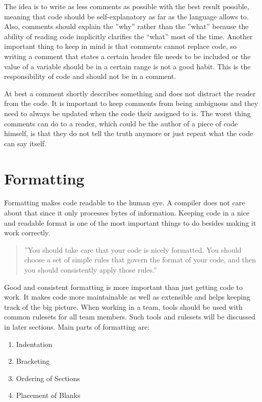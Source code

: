 The idea is to write as less comments as possible with the best result possible, meaning that code should be self-explanatory as far as the language allows to. Also, comments should explain the ''why'' rather than the ''what'' because the ability of reading code implicitly clarifies the “what” most of the time. Another important thing to keep in mind is that comments cannot replace code, so writing a comment that states a certain header file needs to be included or the value of a variable should be in a certain range is not a good habit. This is the responsibility of code and should not be in a comment.

At best a comment shortly describes something and does not distract the reader from the code. It is important to keep comments from being ambiguous and they need to always be updated when the code their assigned to is. The worst thing comments can do to a reader, which could be the author of a piece of code himself, is that they do not tell the truth anymore or just repeat what the code can say itself.

\section{Formatting}
Formatting makes code readable to the human eye. A compiler does not care about that since it only processes bytes of information. Keeping code in a nice and readable format is one of the most important things to do besides making it work correctly.
\begin{quote}
''You should take care that your code is nicely formatted. You should choose a set of simple rules that govern the format of your code, and then you should consistently apply those rules.'' \citep{Martin-Code-2008}
\end{quote}
Good and consistent formatting is more important than just getting code to work. It makes code more maintainable as well as extensible and helps keeping track of the big picture. When working in a team, tools should be used with common rulesets for all team members. Such tools and rulesets will be discussed in later sections.
Main parts of formatting are:
\begin{enumerate}
\item Indentation
\item Bracketing
\item Ordering of Sections
\item Placement of Blanks
\end{enumerate}

